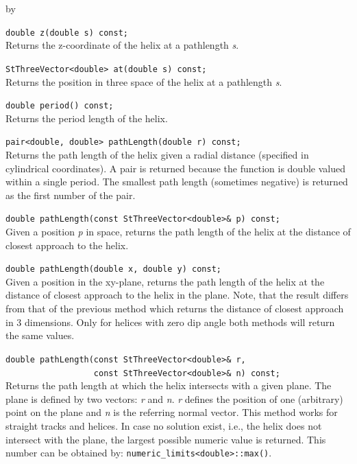 \documentclass[twoside]{article}
\newcommand{\args}[1]{\textit{#1}}%
\newcommand{\entrylabel}[1]{\mbox{\textbf{{#1}}}\hfil}%
\newenvironment{entry}
{\begin{list}{}%
    {\renewcommand{\makelabel}{\entrylabel}%
     \setlength{\labelwidth}{90pt}%
     \setlength{\leftmargin}{\labelwidth}
     \advance\leftmargin by \labelsep%
      }%
    }%
  {\end{list}}
\newcommand{\Entrylabel}[1]%
{\raisebox{0pt}[1ex][0pt]{\makebox[\labelwidth][l]%
    {\parbox[t]{\labelwidth}{\hspace{0pt}\textbf{{#1}}}}}}
\newenvironment{Entry}%
{\renewcommand{\entrylabel}{\Entrylabel}\begin{entry}}%
  {\end{entry}}
\begin{document}
\begin{description}
\begin{Entry}
    \verb+double z(double s) const;+\\
    Returns the z-coordinate of the helix at a pathlength \args{s}.

    \verb+StThreeVector<double> at(double s) const;+\\
    Returns the position in three space of the helix at a pathlength \args{s}.
    
    \verb+double period() const;+\\
    Returns the period length of the helix.

    \verb+pair<double, double> pathLength(double r) const;+\\
    Returns the path length of the helix given a radial distance
    (specified in cylindrical coordinates).  A pair is returned because
    the function is double valued within a single period.  The smallest
    path length (sometimes negative) is returned as the first number of
    the pair.

    \verb+double pathLength(const StThreeVector<double>& p) const;+\\
    Given a position \args{p} in space, returns the path length of the helix
    at the distance of closest approach to the helix.
    
    \verb+double pathLength(double x, double y) const;+\\
    Given a position in the xy-plane, returns the path length of the
    helix at the distance of closest approach to the helix in the
    plane.  Note, that the result differs from that of the previous
    method which returns the distance of closest approach in 3
    dimensions. Only for helices with zero dip angle both methods will
    return the same values.

    \verb+double pathLength(const StThreeVector<double>& r,+\\
    \verb+                  const StThreeVector<double>& n) const;+\\
    Returns the path length at which the helix intersects with a
    given plane. The plane is defined by two vectors: \args{r} and
    \args{n}. \args{r} defines the position of one (arbitrary) point
    on the plane
    and \args{n} is the referring normal vector. This method works
    for straight tracks and helices. In case no solution exist, i.e.,
    the helix does not intersect with the plane, the largest possible
    numeric value is returned. This number can be obtained by:
     \verb+numeric_limits<double>::max()+.\\
     

\end{Entry}
\end{description}
\end{document}
